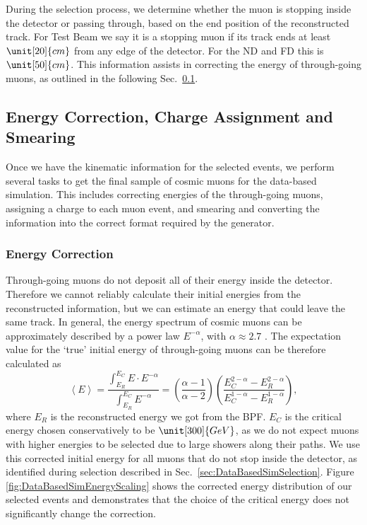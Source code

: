 During the selection process, we determine whether the muon is stopping inside the detector or passing through, based on the end position of the reconstructed track. For Test Beam we say it is a stopping muon if its track ends at least $\unit[20]{cm}$ from any edge of the detector. For the \gls{ND} and \gls{FD} this is $\unit[50]{cm}$. This information assists in correcting the energy of through-going muons, as outlined in the following Sec.~\ref{sec:DataBasedSimPython}.

\subsection{Energy Correction, Charge Assignment and Smearing}\label{sec:DataBasedSimPython}
Once we have the kinematic information for the selected events, we perform several tasks to get the final sample of cosmic muons for the data-based simulation. This includes correcting energies of the through-going muons, assigning a charge to each muon event, and smearing and converting the information into the correct format required by the generator.

\subsubsection*{Energy Correction}
Through-going muons do not deposit all of their energy inside the detector. Therefore we cannot reliably calculate their initial energies from the reconstructed information, but we can estimate an energy that could leave the same track. In general, the energy spectrum of cosmic muons can be approximately described by a power law $E^{-\alpha}$, with $\alpha\approx2.7$ \cite{NOvA-doc-51327,PDG.pdf}. The expectation value for the `true' initial energy of through-going muons can be therefore calculated as
\begin{equation}
\left\langle E\right\rangle =\frac{\int^{E_C}_{E_R} E\cdot E^{-\alpha}}{\int^{E_C}_{E_R} E^{-\alpha}}=\left(\frac{\alpha -1}{\alpha -2}\right)\left(\frac{E_C^{2-\alpha}-E_R^{2-\alpha}}{E_C^{1-\alpha}-E_R^{1-\alpha}}\right),
\end{equation}
where $E_R$ is the reconstructed energy we got from the \gls{BPF}. $E_C$ is the critical energy chosen conservatively to be $\unit[300]{GeV}$, as we do not expect muons with higher energies to be selected due to large showers along their paths. We use this corrected initial energy for all muons that do not stop inside the detector, as identified during selection described in Sec.~\ref{sec:DataBasedSimSelection}. Figure \ref{fig:DataBasedSimEnergyScaling} shows the corrected energy distribution of our selected events and demonstrates that the choice of the critical energy does not significantly change the correction. 

